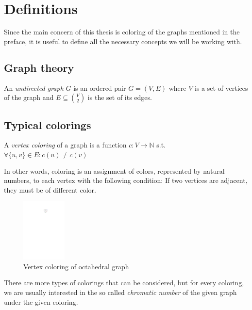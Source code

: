 \chapter{Definitions}

Since the main concern of this thesis is coloring of the graphs mentioned in the preface, it is useful to define all the necessary concepts we will be working with.

\section{Graph theory}

\begin{definition}
    An \textit{undirected graph} $G$ is an ordered pair $G=(V,E)$ where $V$ is a set of vertices of the graph and $E \subseteq \binom{V}{2}$ is the set of its edges.
\end{definition}

\section{Typical colorings}

\begin{definition}
    A \textit{vertex coloring} of a graph is a function $c: V \rightarrow \mathbb{N}$ s.t. $\forall \{u,v\}\in E : c(u) \neq c(v)$
\end{definition}

In other words, coloring is an assignment of colors, represented by natural numbers, to each vertex with the following condition: If two vertices are adjacent, they must be of different color.

\begin{figure}[H]
    \centering
    \includegraphics[width=0.2\textwidth]{../Resources/Figs/octahedral_vtx_colr.pdf}
    \caption{Vertex coloring of octahedral graph}
    \label{fig:octahedral_vtx_coloring}
\end{figure}

There are more types of colorings that can be considered, but for every coloring, we are usually interested in the so called \textit{chromatic number} of the given graph under the given coloring.


